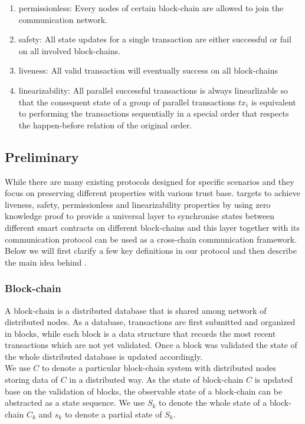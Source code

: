 \documentclass[acmtog, natbib=false]{acmart}
\begin{document}
\begin{enumerate}[leftmargin=*]
\item permissionless: Every nodes of certain block-chain are allowed to join the communication network.
\item safety: All state updates for a single transaction are either successful or fail on all involved block-chains.
\item liveness: All valid transaction will eventually success on all block-chains
\item linearizability: All parallel successful transactions is always linearlizable so that the consequent state of a group of parallel transactions $tx_i$ is equivalent to performing the transactions sequentially in a special order that respects the happen-before relation of the original order.
\end{enumerate}

\subsection{Preliminary}
\label{prelimiary}
While there are many existing protocols designed for specific scenarios and they focus on preserving different properties with various trust base. \dprotocol targets to achieve liveness, safety, permissionless and linearizability properties by using zero knowledge proof to provide a universal layer to synchronise states between different smart contracts on different block-chains and this layer together with its communication protocol can be used as a cross-chain communication framework. Below we will first clarify a few key definitions in our protocol and then describe the main idea behind \dprotocol.

\subsubsection{Block-chain}
A block-chain is a distributed database that is shared among network of distributed nodes\cite{chen2018survey}. As a database, transactions are first submitted and organized in blocks, while each block is a data structure that records the most recent transactions which are not yet validated. Once a block was validated the state of the whole distributed database is updated accordingly.\\
\newline
We use $C$ to denote a particular block-chain system with distributed nodes storing data of $C$ in a distributed way. As the state of block-chain $C$ is updated base on the validation of blocks, the observable state of a block-chain can be abstracted as a state sequence. We use $S_k$ to denote the whole state of a block-chain $C_{k}$ and $s_k$ to denote a partial state of $S_k$.
\end{document}
